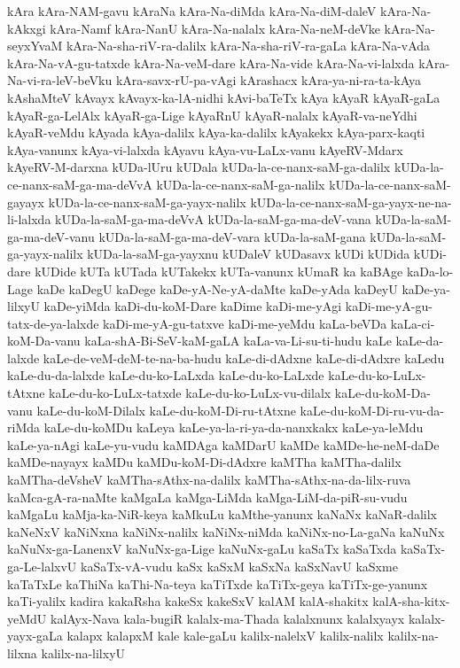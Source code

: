 {kAra
kAra-NAM-gavu
kAraNa
kAra-Na-diMda
kAra-Na-diM-daleV
kAra-Na-kAkxgi
kAra-Namf
kAra-NanU
kAra-Na-nalalx
kAra-Na-neM-deVke
kAra-Na-seyxYvaM
kAra-Na-sha-riV-ra-dalilx
kAra-Na-sha-riV-ra-gaLa
kAra-Na-vAda
kAra-Na-vA-gu-tatxde
kAra-Na-veM-dare
kAra-Na-vide
kAra-Na-vi-lalxda
kAra-Na-vi-ra-leV-beVku
kAra-savx-rU-pa-vAgi
kArashacx
kAra-ya-ni-ra-ta-kAya
kAshaMteV
kAvayx
kAvayx-ka-lA-nidhi
kAvi-baTeTx
kAya
kAyaR
kAyaR-gaLa
kAyaR-ga-LelAlx
kAyaR-ga-Lige
kAyaRnU
kAyaR-nalalx
kAyaR-va-neYdhi
kAyaR-veMdu
kAyada
kAya-dalilx
kAya-ka-dalilx
kAyakekx
kAya-parx-kaqti
kAya-vanunx
kAya-vi-lalxda
kAyavu
kAya-vu-LaLx-vanu
kAyeRV-Mdarx
kAyeRV-M-darxna
kUDa-lUru
kUDala
kUDa-la-ce-nanx-saM-ga-dalilx
kUDa-la-ce-nanx-saM-ga-ma-deVvA
kUDa-la-ce-nanx-saM-ga-nalilx
kUDa-la-ce-nanx-saM-gayayx
kUDa-la-ce-nanx-saM-ga-yayx-nalilx
kUDa-la-ce-nanx-saM-ga-yayx-ne-na-li-lalxda
kUDa-la-saM-ga-ma-deVvA
kUDa-la-saM-ga-ma-deV-vana
kUDa-la-saM-ga-ma-deV-vanu
kUDa-la-saM-ga-ma-deV-vara
kUDa-la-saM-gana
kUDa-la-saM-ga-yayx-nalilx
kUDa-la-saM-ga-yayxnu
kUDaleV
kUDasavx
kUDi
kUDida
kUDi-dare
kUDide
kUTa
kUTada
kUTakekx
kUTa-vanunx
kUmaR
ka
kaBAge
kaDa-lo-Lage
kaDe
kaDegU
kaDege
kaDe-yA-Ne-yA-daMte
kaDe-yAda
kaDeyU
kaDe-ya-lilxyU
kaDe-yiMda
kaDi-du-koM-Dare
kaDime
kaDi-me-yAgi
kaDi-me-yA-gu-tatx-de-ya-lalxde
kaDi-me-yA-gu-tatxve
kaDi-me-yeMdu
kaLa-beVDa
kaLa-ci-koM-Da-vanu
kaLa-shA-Bi-SeV-kaM-gaLA
kaLa-va-Li-su-ti-hudu
kaLe
kaLe-da-lalxde
kaLe-de-veM-deM-te-na-ba-hudu
kaLe-di-dAdxne
kaLe-di-dAdxre
kaLedu
kaLe-du-da-lalxde
kaLe-du-ko-LaLxda
kaLe-du-ko-LaLxde
kaLe-du-ko-LuLx-tAtxne
kaLe-du-ko-LuLx-tatxde
kaLe-du-ko-LuLx-vu-dilalx
kaLe-du-koM-Da-vanu
kaLe-du-koM-Dilalx
kaLe-du-koM-Di-ru-tAtxne
kaLe-du-koM-Di-ru-vu-da-riMda
kaLe-du-koMDu
kaLeya
kaLe-ya-la-ri-ya-da-nanxkakx
kaLe-ya-leMdu
kaLe-ya-nAgi
kaLe-yu-vudu
kaMDAga
kaMDarU
kaMDe
kaMDe-he-neM-daDe
kaMDe-nayayx
kaMDu
kaMDu-koM-Di-dAdxre
kaMTha
kaMTha-dalilx
kaMTha-deVsheV
kaMTha-sAthx-na-dalilx
kaMTha-sAthx-na-da-lilx-ruva
kaMca-gA-ra-naMte
kaMgaLa
kaMga-LiMda
kaMga-LiM-da-piR-su-vudu
kaMgaLu
kaMja-ka-NiR-keya
kaMkuLu
kaMthe-yanunx
kaNaNx
kaNaR-dalilx
kaNeNxV
kaNiNxna
kaNiNx-nalilx
kaNiNx-niMda
kaNiNx-no-La-gaNa
kaNuNx
kaNuNx-ga-LanenxV
kaNuNx-ga-Lige
kaNuNx-gaLu
kaSaTx
kaSaTxda
kaSaTx-ga-Le-lalxvU
kaSaTx-vA-vudu
kaSx
kaSxM
kaSxNa
kaSxNavU
kaSxme
kaTaTxLe
kaThiNa
kaThi-Na-teya
kaTiTxde
kaTiTx-geya
kaTiTx-ge-yanunx
kaTi-yalilx
kadira
kakaRsha
kakeSx
kakeSxV
kalAM
kalA-shakitx
kalA-sha-kitx-yeMdU
kalAyx-Nava
kala-bugiR
kalalx-ma-Thada
kalalxnunx
kalalxyayx
kalalx-yayx-gaLa
kalapx
kalapxM
kale
kale-gaLu
kalilx-nalelxV
kalilx-nalilx
kalilx-na-lilxna
kalilx-na-lilxyU
}
